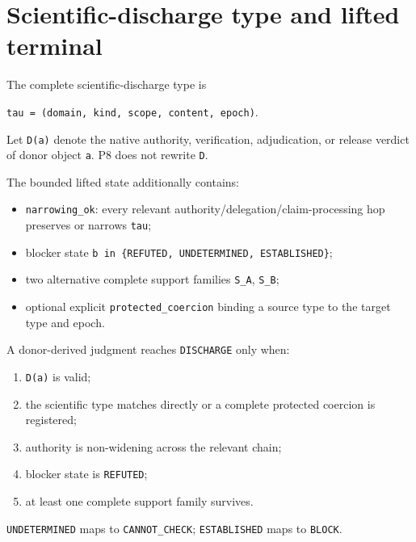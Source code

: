 \section{Scientific-discharge type and lifted terminal}

The complete scientific-discharge type is

\texttt{tau = (domain, kind, scope, content, epoch)}.

Let \texttt{D(a)} denote the native authority, verification, adjudication, or release verdict of donor object \texttt{a}. P8 does not rewrite \texttt{D}.

The bounded lifted state additionally contains:

\begin{itemize}
  \item \texttt{narrowing_ok}: every relevant authority/delegation/claim-processing hop preserves or narrows \texttt{tau};
  \item blocker state \texttt{b in \{REFUTED, UNDETERMINED, ESTABLISHED\}};
  \item two alternative complete support families \texttt{S_A}, \texttt{S_B};
  \item optional explicit \texttt{protected_coercion} binding a source type to the target type and epoch.
\end{itemize}

A donor-derived judgment reaches \texttt{DISCHARGE} only when:

\begin{enumerate}
  \item \texttt{D(a)} is valid;
  \item the scientific type matches directly or a complete protected coercion is registered;
  \item authority is non-widening across the relevant chain;
  \item blocker state is \texttt{REFUTED};
  \item at least one complete support family survives.
\end{enumerate}

\texttt{UNDETERMINED} maps to \texttt{CANNOT_CHECK}; \texttt{ESTABLISHED} maps to \texttt{BLOCK}.
